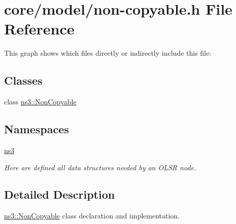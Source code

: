 \hypertarget{non-copyable_8h}{}\section{core/model/non-\/copyable.h File Reference}
\label{non-copyable_8h}
This graph shows which files directly or indirectly include this file\+:
\subsection*{Classes}
\begin{DoxyCompactItemize}
\item 
class \hyperlink{classns3_1_1NonCopyable}{ns3\+::\+Non\+Copyable}
\end{DoxyCompactItemize}
\subsection*{Namespaces}
\begin{DoxyCompactItemize}
\item 
 \hyperlink{namespacens3}{ns3}
\begin{DoxyCompactList}\small\item\em Here are defined all data structures needed by an O\+L\+SR node. \end{DoxyCompactList}\end{DoxyCompactItemize}


\subsection{Detailed Description}
\hyperlink{classns3_1_1NonCopyable}{ns3\+::\+Non\+Copyable} class declaration and implementation. 